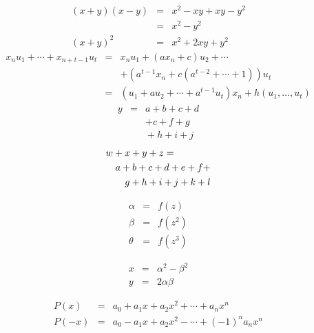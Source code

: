 \documentclass{article}
\begin{document}
	\begin{eqnarray}
		(x+y)(x-y) & = & x^2-xy+xy-y^2 \nonumber\\
				& = & x^2 - y^2 \\
		(x+y)^2   & = & x^2 + 2xy + y^2
	\end{eqnarray}
	\begin{eqnarray*}
		x_nu_1 + \cdots + x_{n+t-1}u_t & = & x_nu_1 + (ax_n + c)u_2 + \cdots\\
		& & + \left(a^{t-1}x_n + c(a^{t-2} + \cdots + 1)\right)u_t \\
		& = & (u_1 + au_2 + \cdots + a^{t-1}u_t)x_n + h(u_1, \ldots, u_t)
	\end{eqnarray*}
	\begin{eqnarray*}
		y & = & a + b + c + d\\
		 &   & + c + f +g \\
		&   & {} + h + i + j %
	\end{eqnarray*}
	\begin{eqnarray*}
		\lefteqn{w+x+y+z = }\\ %
		& & a+b+c+d+e+f+\\
		& & g+h+i+j+k+l
	\end{eqnarray*}
	\parbox{4cm}{\begin{eqnarray} \alpha & = & f(z) \\
						\beta & = & f(z^2) \\
						\theta & = & f(z^3)
			\end{eqnarray}}
		\hfill \parbox{2.5cm}{\begin{eqnarray*}
			x & = & \alpha^2 - \beta^2 \\
			y & = & 2\alpha\beta
			\end{eqnarray*}}
	\parbox{10cm}{\begin{eqnarray*}
			P(x) & = & a_0 + a_1x + a_2x^2 + \cdots + a_nx^n\\
			P(-x) & = & a_0 - a_1x + a_2x^2 - \cdots + (-1)^na_nx^n
			\end{eqnarray*}} \hfill
	\parbox{1cm}{\begin{eqnarray} \end{eqnarray}}
	\\
\end{document}
